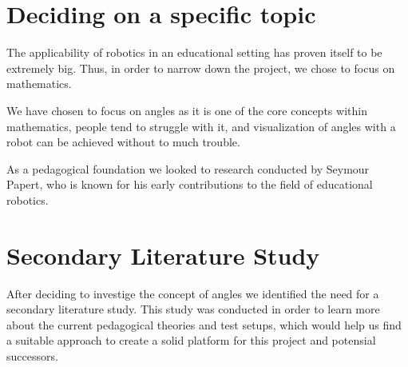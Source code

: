\section{Deciding on a specific topic}\label{sec:decideTopic}
The applicability of robotics in an educational setting has proven itself to be extremely big. Thus, in order to narrow down the project, we chose to focus on mathematics. 

\bigskip\noindent
We have chosen to focus on angles as it is one of the core concepts within mathematics, people tend to struggle with it, and visualization of angles with a robot can be achieved without to much trouble. 

\bigskip\noindent
As a pedagogical foundation we looked to research conducted by Seymour Papert, who is known for his early contributions to the field of educational robotics.

\section{Secondary Literature Study}
After deciding to investige the concept of angles we identified the need for a secondary literature study. 
This study was conducted in order to learn more about the current pedagogical theories and test setups, which would help us find a suitable approach to create a solid platform for this project and potensial successors.


